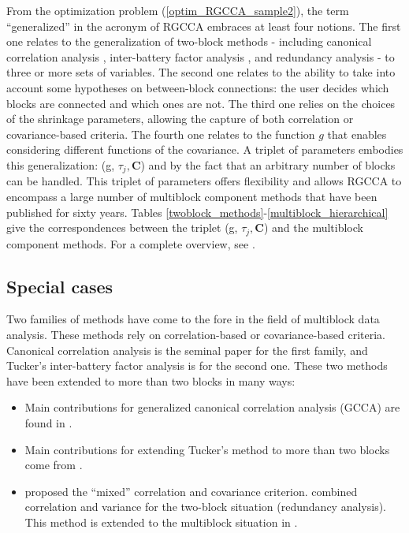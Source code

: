 \documentclass[
]{jss}
\begin{document}
From the optimization problem (\ref{optim_RGCCA_sample2}), the term
``generalized'' in the acronym of RGCCA embraces at least four notions.
The first one relates to the generalization of two-block methods -
including canonical correlation analysis \citep{Hotelling1936},
inter-battery factor analysis \citep{Tucker1958}, and redundancy
analysis \citep{Wollenberg1977} - to three or more sets of variables.
The second one relates to the ability to take into account some
hypotheses on between-block connections: the user decides which blocks
are connected and which ones are not. The third one relies on the
choices of the shrinkage parameters, allowing the capture of both
correlation or covariance-based criteria. The fourth one relates to the
function \(g\) that enables considering different functions of the
covariance. A triplet of parameters embodies this generalization: (g,
\(\tau_j, \mathbf C\)) and by the fact that an arbitrary number of
blocks can be handled. This triplet of parameters offers flexibility and
allows RGCCA to encompass a large number of multiblock component methods
that have been published for sixty years. Tables
\ref{twoblock_methods}-\ref{multiblock_hierarchical} give the
correspondences between the triplet (g, \(\tau_j, \mathbf C\)) and the
multiblock component methods. For a complete overview, see
\cite{Tenenhaus2017}.

\hypertarget{special-cases}{%
\subsection{Special cases}\label{special-cases}}

Two families of methods have come to the fore in the field of multiblock
data analysis. These methods rely on correlation-based or
covariance-based criteria. Canonical correlation analysis
\citep{Hotelling1936} is the seminal paper for the first family, and
Tucker's inter-battery factor analysis \citep{Tucker1958} is for the
second one. These two methods have been extended to more than two blocks
in many ways:

\begin{itemize}
\item
  Main contributions for generalized canonical correlation analysis
  (GCCA) are found in
  \cite{Horst1961, Carroll1968a, Kettenring1971, Wold1982, Wold1985, Hanafi2007}.
\item
  Main contributions for extending Tucker's method to more than two
  blocks come from
  \cite{Carroll1968b, Chessel1996, Hanafi2006, Hanafi2010, Hanafi2011, Hanafi2006, Kramer2007, Smilde2003, TenBerge1988, VandeGeer1984, Westerhuis1998, Wold1982, Wold1985}.
\item
  \cite{Carroll1968b} proposed the ``mixed'' correlation and covariance
  criterion. \cite{Wollenberg1977} combined correlation and variance for
  the two-block situation (redundancy analysis). This method is extended
  to the multiblock situation in \cite{Tenenhaus2011, Tenenhaus2017}.
\end{itemize}
\end{document}
